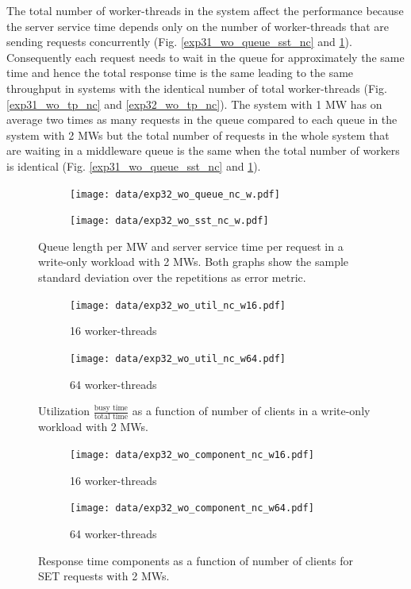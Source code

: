 \documentclass[report.tex]{subfiles}
\begin{document}
The total number of worker-threads in the system affect the performance because the server service time depends only on the number of worker-threads that are sending requests concurrently (Fig. \ref{exp31_wo_queue_sst_nc} and \ref{exp32_wo_queue_sst_nc}).
Consequently each request needs to wait in the queue for approximately the same time and hence the total response time is the same leading to the same throughput in systems with the identical number of total worker-threads (Fig. \ref{exp31_wo_tp_nc} and \ref{exp32_wo_tp_nc}).
The system with 1 MW has on average two times as many requests in the queue compared to each queue in the system with 2 MWs 
but the total number of requests in the whole system that are waiting in a middleware queue is the same when the total number of workers is identical (Fig. \ref{exp31_wo_queue_sst_nc} and \ref{exp32_wo_queue_sst_nc}).
\vspace{-2mm}

\begin{figure}[H]
	\begin{subfigure}[b]{.499\linewidth}
		\centering
		\texttt{[image: data/exp32\_wo\_queue\_nc\_w.pdf]}
	\end{subfigure}\hfill
	\begin{subfigure}[b]{.499\linewidth}
		\centering
		\texttt{[image: data/exp32\_wo\_sst\_nc\_w.pdf]}
	\end{subfigure}\hfill
	\caption{Queue length per MW and server service time per request in a write-only workload with 2 MWs. Both graphs show the sample standard deviation over the repetitions as error metric.}\label{exp32_wo_queue_sst_nc}
\end{figure}

\begin{figure}[H]
	\begin{subfigure}[b]{.499\linewidth}
		\centering
		\texttt{[image: data/exp32\_wo\_util\_nc\_w16.pdf]}
		\caption{16 worker-threads}
	\end{subfigure}\hfill
	\begin{subfigure}[b]{.499\linewidth}
		\centering
		\texttt{[image: data/exp32\_wo\_util\_nc\_w64.pdf]}
		\caption{64 worker-threads}
	\end{subfigure}\hfill
	\caption{Utilization $\frac{\text{busy time}}{\text{total time}}$ as a function of number of clients in a write-only workload with 2 MWs.}\label{exp32_wo_util_nc}
\end{figure}

\begin{figure}[H]
	\begin{subfigure}[b]{.499\linewidth}
		\centering
		\texttt{[image: data/exp32\_wo\_component\_nc\_w16.pdf]}
		\caption{16 worker-threads}
	\end{subfigure}\hfill
	\begin{subfigure}[b]{.499\linewidth}
		\centering
		\texttt{[image: data/exp32\_wo\_component\_nc\_w64.pdf]}
		\caption{64 worker-threads}
	\end{subfigure}\hfill
	\caption{Response time components as a function of number of clients for SET requests with 2 MWs.}\label{exp32_wo_rtcomp_nc}
\end{figure}
\end{document}
